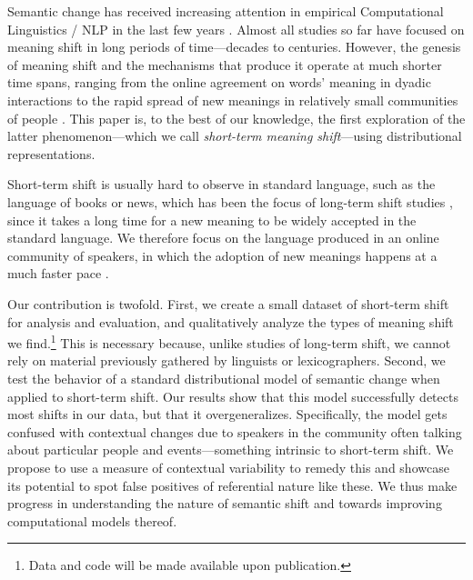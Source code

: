 Semantic change has received increasing attention in empirical Computational Linguistics / NLP in the last few years \cite{tang2018state,KutuzovEtal-coling2018}. Almost all studies so far have focused on meaning shift in long periods of time---decades to centuries. However, the genesis of meaning shift and the mechanisms that produce it operate at much shorter time spans, ranging
from the online agreement on words' meaning in dyadic interactions \cite{brennan1996conceptual} to the rapid spread of new meanings in relatively small communities of people \cite{wenger1998communities,eckert-mcconnellginet1992}.
This paper is, to the best of our knowledge, the first exploration of the latter phenomenon---which we call \textit{short-term meaning shift}---using distributional representations.

Short-term shift is usually hard to observe in standard language, such
as the language of books or news, which has been the focus of
long-term shift studies \cite[e.g.,][]{hamilton2016diachronic,kulkarni2015statistically}, since
it takes a long time for a new meaning to be widely accepted in the standard language. 
We therefore focus on the language produced in an online community of speakers, in which the 
adoption of new meanings happens at a much faster pace \cite{Clark96,hasan2009}.

Our contribution is twofold. First, we create a small dataset of short-term shift for analysis and evaluation, and qualitatively analyze the types of meaning shift we find.\footnote{Data and code will be made available upon
publication.} This is necessary because, unlike studies of long-term shift, we cannot rely on material previously gathered by linguists or lexicographers.
Second, we test the behavior of a standard distributional model of semantic change when
 applied to short-term shift. 
Our results show that this model successfully detects most shifts in our data, but that it overgeneralizes. Specifically, the model gets confused with contextual changes due to speakers in the community often talking about particular people and events---something intrinsic to short-term shift. We propose to use a measure of contextual variability to remedy this and showcase its potential to spot false positives of referential nature like these.
We thus make progress in understanding the nature of semantic shift and towards improving computational models thereof.



